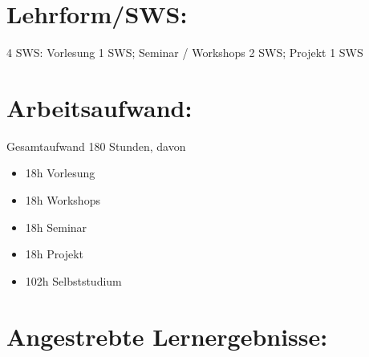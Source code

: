 \section*{Lehrform/SWS:\label{/mi-2017/modulbeschreibungen-master/MA_VC_Modul_Visualisierung}}\label{lehrformswspathlabelmi-2017modulbeschreibungen-mastermaux5fvcux5fmodulux5fvisualisierung}

4 SWS: Vorlesung 1 SWS; Seminar / Workshops 2 SWS; Projekt 1 SWS

\section*{Arbeitsaufwand:\label{/mi-2017/modulbeschreibungen-master/MA_VC_Modul_Visualisierung}}\label{arbeitsaufwandpathlabelmi-2017modulbeschreibungen-mastermaux5fvcux5fmodulux5fvisualisierung}

Gesamtaufwand 180 Stunden, davon

\begin{itemize}
\tightlist
\item
  18h Vorlesung
\item
  18h Workshops
\item
  18h Seminar
\item
  18h Projekt
\item
  102h Selbststudium
\end{itemize}

\section*{Angestrebte
Lernergebnisse:\label{/mi-2017/modulbeschreibungen-master/MA_VC_Modul_Visualisierung}}\label{angestrebte-lernergebnissepathlabelmi-2017modulbeschreibungen-mastermaux5fvcux5fmodulux5fvisualisierung}

